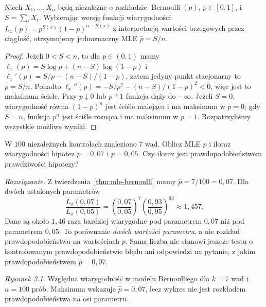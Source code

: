 \begin{twierdzenie}\label{thm:mle-bernoulli}
Niech $X_1,\ldots,X_n$ będą niezależne o rozkładzie $\operatorname{Bernoulli}(p)$,
$p\in[0,1]$, i $S=\sum_iX_i$. Wybierając wersję funkcji wiarygodności
$L_x(p)=p^{S(x)}(1-p)^{n-S(x)}$ z interpretacją wartości brzegowych przez
ciągłość, otrzymujemy jednoznaczny MLE $\widehat p=S/n$.
\end{twierdzenie}
\begin{proof}
Jeżeli $0<S<n$, to dla $p\in(0,1)$ mamy
$\ell_x(p)=S\log p+(n-S)\log(1-p)$ i
$\ell_x'(p)=S/p-(n-S)/(1-p)$, zatem jedyny punkt stacjonarny to
$p=S/n$. Ponadto $\ell_x''(p)=-S/p^2-(n-S)/(1-p)^2<0$, więc jest to
maksimum ścisłe. Przy $p\downarrow0$ lub $p\uparrow1$ funkcja dąży do
$-\infty$. Jeżeli $S=0$, wiarygodność równa $(1-p)^n$ jest ściśle malejąca
i ma maksimum w $p=0$; gdy $S=n$, funkcja $p^n$ jest ściśle rosnąca i ma
maksimum w $p=1$. Rozpatrzyliśmy wszystkie możliwe wyniki.
\end{proof}

\begin{zadanie}\label{zad:lik-quality}
W $100$ niezależnych kontrolach znaleziono $7$ wad. Oblicz MLE $p$ i iloraz
wiarygodności hipotez $p=0{,}07$ i $p=0{,}05$. Czy iloraz jest prawdopodobieństwem
prawdziwości hipotezy?
\par\emph{Rozwiązanie.} Z twierdzenia~\ref{thm:mle-bernoulli} mamy
$\widehat p=7/100=0{,}07$. Dla dwóch ustalonych parametrów
\[
\frac{L_x(0{,}07)}{L_x(0{,}05)}
=\left(\frac{0{,}07}{0{,}05}\right)^7
 \left(\frac{0{,}93}{0{,}95}\right)^{93}
\approx1{,}457.
\]
Dane są około $1{,}46$ raza bardziej wiarygodne pod parametrem $0{,}07$
niż pod parametrem $0{,}05$. To porównanie \emph{dwóch wartości parametru},
a nie rozkład prawdopodobieństwa na wartościach $p$. Sama liczba nie
stanowi jeszcze testu o kontrolowanym prawdopodobieństwie błędu ani
odpowiedzi na pytanie, z jakim prawdopodobieństwem $p=0{,}07$.
\end{zadanie}

\begin{center}
\end{center}
\noindent\emph{Rysunek 3.1.} Względna wiarygodność w modelu
Bernoulliego dla $k=7$ wad i $n=100$ prób. Maksimum wskazuje
$\widehat p=0{,}07$, lecz wykres nie jest rozkładem prawdopodobieństwa
na osi parametru.


